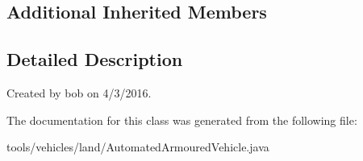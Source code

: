 \subsection*{Additional Inherited Members}


\subsection{Detailed Description}
Created by bob on 4/3/2016. 

The documentation for this class was generated from the following file\+:\begin{DoxyCompactItemize}
\item 
tools/vehicles/land/Automated\+Armoured\+Vehicle.\+java\end{DoxyCompactItemize}
